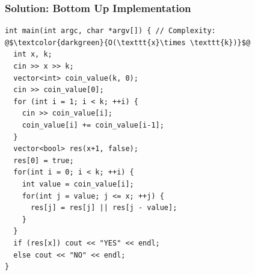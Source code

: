 \documentclass{beamer}
\newcommand{\uvalink}[2]{UVa Online Judge (http://uva.onlinejudge.org)
  problem number \href{#2}{\textcolor{blue}{#1}.}}
\newcounter{exo}
\newcommand{\exo}{
  \addtocounter{exo}{1}
  Exercice \arabic{exo}
}
\begin{document}
\begin{frame}[containsverbatim]
\frametitle{Solution: Bottom Up Implementation}

\scriptsize
\begin{lstlisting}
int main(int argc, char *argv[]) { // Complexity: @$\textcolor{darkgreen}{O(\texttt{x}\times \texttt{k})}$@
  int x, k;
  cin >> x >> k;
  vector<int> coin_value(k, 0);
  cin >> coin_value[0];
  for (int i = 1; i < k; ++i) {
    cin >> coin_value[i];
    coin_value[i] += coin_value[i-1];
  }
  vector<bool> res(x+1, false);
  res[0] = true;
  for(int i = 0; i < k; ++i) {
    int value = coin_value[i];
    for(int j = value; j <= x; ++j) {
      res[j] = res[j] || res[j - value];
    }
  }
  if (res[x]) cout << "YES" << endl;
  else cout << "NO" << endl;
}
\end{lstlisting}

\end{frame}

\fi


\ifanswers
\end{document}
